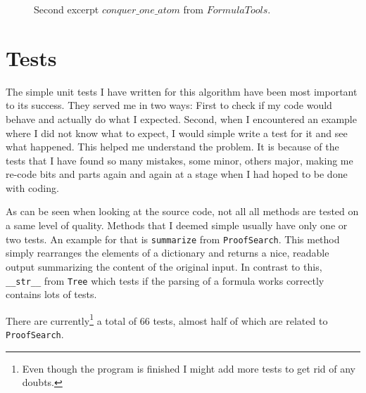 \begin{figure}[H]
	\caption{Second excerpt $conquer\_one\_ atom$ from $FormulaTools$.}
	\vspace{-10pt}
	
	\vspace{-10pt}
\end{figure}

\bigskip


\section{Tests}
The simple unit tests I have written for this algorithm have been most important to its success. They served me in two ways: First to check if my code would behave and actually do what I expected. Second, when I encountered an example where I did not know what to expect, I would simple write a test for it and see what happened. This helped me understand the problem.
It is because of the tests that I have found so many mistakes, some minor, others major, making me re-code bits and parts again and again at a stage when I had hoped to be done with coding.

As can be seen when looking at the source code, not all all methods are tested on a same level of quality. Methods that I deemed simple usually have only one or two tests. An example for that is \texttt{summarize} from \texttt{ProofSearch}. This method simply rearranges the elements of a dictionary and returns a nice, readable output summarizing the content of the original input. In contrast to this, \texttt{\_\_str\_\_} from \texttt{Tree} which tests if the parsing of a formula works correctly contains lots of tests.

There are currently\footnote{Even though the program is finished I might add more tests to get rid of any doubts.} a total of 66 tests, almost half of which are related to \texttt{ProofSearch}. 